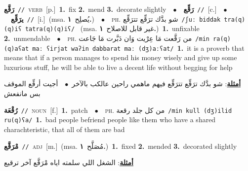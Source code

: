\documentclass[10pt,a4paper,twoside]{article} %
\begin{document}
\begin{multicols}{2}
{\setlength\topsep{0pt}\textbf{\foreignlanguage{arabic}{رَقَّع}}\ {\color{gray}\texttt{//}\color{black}}\ \textsc{verb}\ [p.]\ \textbf{1.}~fix  \textbf{2.}~mend  \textbf{3.}~decorate slightly\ \ $\bullet$\ \ \setlength\topsep{0pt}\textbf{\foreignlanguage{arabic}{رَقِّع}}\ {\color{gray}\texttt{//}\color{black}}\ [c.]\ \ $\bullet$\ \ \setlength\topsep{0pt}\textbf{\foreignlanguage{arabic}{يرَقِّع}}\ {\color{gray}\texttt{//}\color{black}}\ [i.]\ \color{gray}(msa. \foreignlanguage{arabic}{يُصلِح}~\foreignlanguage{arabic}{\textbf{١.}})\color{black}\ \ $\bullet$\ \ \textsc{ph.} \color{gray} \foreignlanguage{arabic}{شو بدَّك ترَقِّع تترَقِّع}\color{black}\ {\color{gray}\texttt{/{\sffamily ʃuː biddak tra(q)(q)iʕ tatra(q)(q)iʕ}/}\color{black}}\ \color{gray} (msa. \foreignlanguage{arabic}{غير قابل للاصلاح}~\foreignlanguage{arabic}{\textbf{١.}})\color{black}\ \textbf{1.}~unfixable  \textbf{2.}~unmendable\ \ $\bullet$\ \ \textsc{ph.} \color{gray} \foreignlanguage{arabic}{من رَقَّعت مَا عِرْيت وَان دَبَّرت مَا جَاعت}\color{black}\ {\color{gray}\texttt{/{\sffamily min ra(q)(q)aʕat maː ʕirjat waʔin dabbarat maː (dʒ)aːʕat}/}\color{black}}\ \textbf{1.}~it is a proverb that means that if a person manages to spend his money wisely and give up some luxurious stuff, he will be able to live a decent life without begging for help\  \begin{flushright}\color{gray}\foreignlanguage{arabic}{\textbf{\underline{\foreignlanguage{arabic}{أمثلة}}}: شو بدَّك ترَقِّع تترَقِّع فيهم ماهمي راحين عالكب بالآخر\ $\bullet$\ \  أجيت أرقِّع الموقف بس مانفعش}\end{flushright}\color{black}} \vspace{2mm}

{\setlength\topsep{0pt}\textbf{\foreignlanguage{arabic}{رُقْعَة}}\ {\color{gray}\texttt{//}\color{black}}\ \textsc{noun}\ [f.]\ \textbf{1.}~patch\ \ $\bullet$\ \ \textsc{ph.} \color{gray} \foreignlanguage{arabic}{من كل جلد رقعة}\color{black}\ {\color{gray}\texttt{/{\sffamily min kull (dʒ)ilid ru(q)ʕa}/}\color{black}}\ \textbf{1.}~bad people befriend people like them who have a shared charachteristic, that all of them are bad\ } \vspace{2mm}

{\setlength\topsep{0pt}\textbf{\foreignlanguage{arabic}{مْرَقَّع}}\ {\color{gray}\texttt{//}\color{black}}\ \textsc{adj}\ [m.]\ \color{gray}(msa. \foreignlanguage{arabic}{مُصَلَّح}~\foreignlanguage{arabic}{\textbf{١.}})\color{black}\ \textbf{1.}~fixed  \textbf{2.}~mended  \textbf{3.}~decorated slightly\  \begin{flushright}\color{gray}\foreignlanguage{arabic}{\textbf{\underline{\foreignlanguage{arabic}{أمثلة}}}: الشغل اللي سلمته اياه مْرَقَّع آخر ترقيع}\end{flushright}\color{black}} \vspace{2mm}


\end{multicols}
\end{document}
